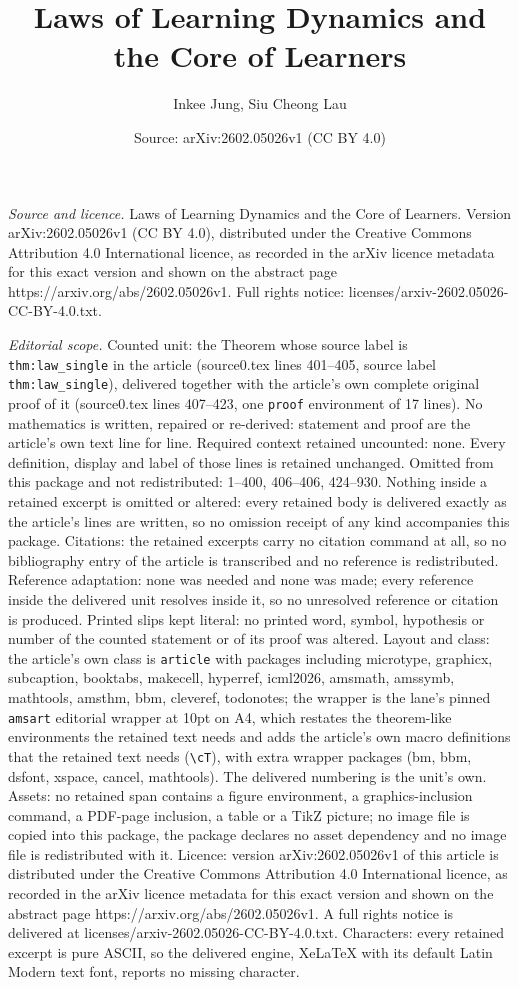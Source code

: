 \documentclass[10pt,a4paper]{amsart}
\title[Laws of Learning Dynamics and the Core of Learners]{Laws of Learning Dynamics and the Core of Learners}
\author{Inkee Jung, Siu Cheong Lau}
\date{Source: arXiv:2602.05026v1 (CC BY 4.0)}
\begin{document}
\maketitle

\noindent\emph{Source and licence.} Laws of Learning Dynamics and the Core of Learners. Version arXiv:2602.05026v1 (CC BY 4.0), distributed under the Creative Commons Attribution 4.0 International licence, as recorded in the arXiv licence metadata for this exact version and shown on the abstract page https://arxiv.org/abs/2602.05026v1. Full rights notice: licenses/arxiv-2602.05026-CC-BY-4.0.txt.\par\smallskip

\noindent\textit{Editorial scope.} Counted unit: the Theorem whose source label is \texttt{thm:law\_single} in the article (source0.tex lines 401--405, source label \texttt{thm:law\_single}), delivered together with the article's own complete original proof of it (source0.tex lines 407--423, one \texttt{proof} environment of 17 lines). No mathematics is written, repaired or re-derived: statement and proof are the article's own text line for line. Required context retained uncounted: none. Every definition, display and label of those lines is retained unchanged. Omitted from this package and not redistributed: 1--400, 406--406, 424--930. Nothing inside a retained excerpt is omitted or altered: every retained body is delivered exactly as the article's lines are written, so no omission receipt of any kind accompanies this package. Citations: the retained excerpts carry no citation command at all, so no bibliography entry of the article is transcribed and no reference is redistributed. Reference adaptation: none was needed and none was made; every reference inside the delivered unit resolves inside it, so no unresolved reference or citation is produced. Printed slips kept literal: no printed word, symbol, hypothesis or number of the counted statement or of its proof was altered. Layout and class: the article's own class is \texttt{article} with packages including microtype, graphicx, subcaption, booktabs, makecell, hyperref, icml2026, amsmath, amssymb, mathtools, amsthm, bbm, cleveref, todonotes; the wrapper is the lane's pinned \texttt{amsart} editorial wrapper at 10pt on A4, which restates the theorem-like environments the retained text needs and adds the article's own macro definitions that the retained text needs (\texttt{\textbackslash cT}), with extra wrapper packages (bm, bbm, dsfont, xspace, cancel, mathtools). The delivered numbering is the unit's own. Assets: no retained span contains a figure environment, a graphics-inclusion command, a PDF-page inclusion, a table or a TikZ picture; no image file is copied into this package, the package declares no asset dependency and no image file is redistributed with it. Licence: version arXiv:2602.05026v1 of this article is distributed under the Creative Commons Attribution 4.0 International licence, as recorded in the arXiv licence metadata for this exact version and shown on the abstract page https://arxiv.org/abs/2602.05026v1. A full rights notice is delivered at licenses/arxiv-2602.05026-CC-BY-4.0.txt. Characters: every retained excerpt is pure ASCII, so the delivered engine, XeLaTeX with its default Latin Modern text font, reports no missing character.
\end{document}
